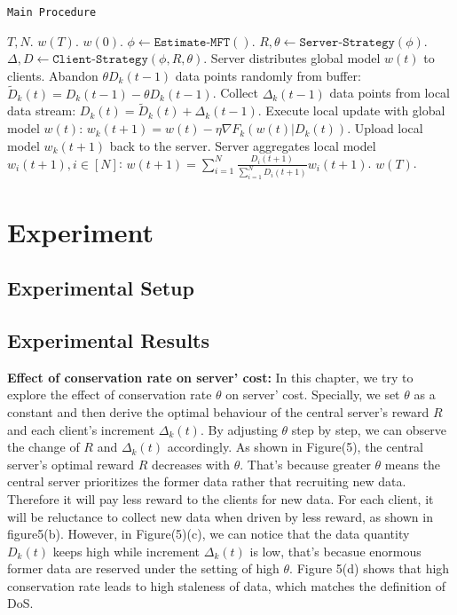 \documentclass{article}
\theoremstyle{plain}
\theoremstyle{definition}
\theoremstyle{remark}
\begin{document}
 \begin{algorithm}
    \caption{\texttt{Main Procedure}}
    \begin{algorithmic}[1]
         $T, N$.
         $w(T)$.
         $w(0)$.
        \STATE $\phi \gets \texttt{Estimate-MFT}()$.
        \STATE $R, \theta \gets \texttt{Server-Strategy}(\phi)$.
        \STATE $\Delta, D \gets \texttt{Client-Strategy}(\phi, R, \theta)$.
            \STATE Server distributes global model $w(t)$ to clients.
                \STATE Abandon $\theta D_k(t-1)$ data points randomly from buffer: $\widetilde{D}_k(t) = D_k(t-1) - \theta D_k(t-1)$.
                \STATE Collect $\Delta_k(t-1)$ data points from local data stream: $D_k(t) = \widetilde{D}_k(t) + \Delta_k(t-1)$.
                \STATE Execute local update with global model $w(t)$: $w_k(t+1) = w(t) - \eta \nabla F_k(w(t)|D_k(t))$. 
                \STATE Upload local model $w_k(t+1)$ back to the server.
            \ENDFOR
            \STATE Server aggregates local model $w_i(t+1), i \in [N]$: $w(t+1) = \sum_{i=1}^{N} \frac{D_i(t+1)}{\sum_{i=1}^{N}D_i(t+1)} w_i(t+1)$.
        \ENDFOR
         $w(T)$.
    \end{algorithmic}
 \end{algorithm}

\section{Experiment}
\subsection{Experimental Setup}
\subsection{Experimental Results}
\textbf{Effect of conservation rate on server' cost:}
In this chapter, we try to explore the effect of conservation rate $\theta$ on server' cost. Specially, we set $\theta$ as a constant and then derive the optimal behaviour of the central server's reward $R$ and each client's increment $\Delta_k(t)$.
By adjusting $\theta$ step by step, we can observe the change of $R$ and $\Delta_k(t)$ accordingly.
As shown in Figure(5), the central server's optimal reward $R$ decreases with $\theta$. That's because greater $\theta$ means the central server prioritizes the former data rather that recruiting new data. Therefore it will pay less reward to the clients for new data.
For each client, it will be reluctance to collect new data when driven by less reward, as shown in figure5(b).
However, in Figure(5)(c), we can notice that the data quantity $D_k(t)$ keeps high while increment $\Delta_k(t)$ is low, that's becasue enormous former data are reserved under the setting of high $\theta$.
Figure 5(d) shows that high conservation rate leads to high staleness of data, which matches the definition of DoS.
\end{document}
